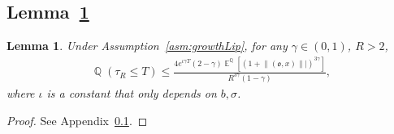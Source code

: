\documentclass[10pt,a4paper]{amsart}
\newtheorem{lemma}{Lemma}
\DeclareMathOperator{\E}{\mathbb{E}}
\DeclareMathOperator{\Q}{\mathbb{Q}}
\def\mo{\mathfrak{o}}
\begin{document}
\subsection{Lemma~\ref{lem:stopP}} \label{app:Lemma}

\begin{lemma}\label{lem:stopP}
  Under Assumption~\ref{asm:growthLip}, for any $\gamma \in (0,1)$, $R>2$,
    \begin{align}\label{eq:lenglart}
       \Q( \tau_R \leq T)  \leq \frac{ 4 e^{\iota \gamma T} (2-\gamma) \E^{\Q}[(1+\lVert(\mo ,x)\rVert|)^{3\gamma}]}{R^{3 \gamma}(1-\gamma) },
    \end{align}
    where $\iota$ is a constant that only depends on $b,\sigma$. 
\end{lemma}

\begin{proof}
    See Appendix~\ref{app:Lemma}.
\end{proof}
\end{document}
